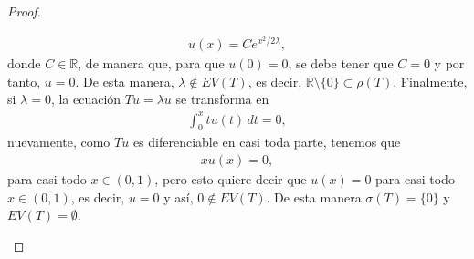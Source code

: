\begin{proof}
\begin{enumerate}
        \begin{align*}
            u(x)=Ce^{x^2/2\lambda},
        \end{align*}
        donde $C \in \mathbb{R}$, de manera que, para que $u(0)=0$, se debe tener que $C=0$ y por tanto, $u=0$. De esta manera, $\lambda\notin EV(T)$, es decir, $\mathbb{R}\setminus \{0\}\subset \rho(T)$. Finalmente, si $\lambda=0$, la ecuación $Tu=\lambda u$ se transforma en
        \begin{align*}
            \int_0^x tu(t)\, dt=0,
        \end{align*}
        nuevamente, como $Tu$ es diferenciable en casi toda parte, tenemos que 
        \begin{align*}
            xu(x)=0,
        \end{align*}
        para casi todo $x \in (0,1)$, pero esto quiere decir que $u(x)=0$ para casi todo $x \in (0,1)$, es decir, $u=0$ y así, $0 \notin EV(T)$. De esta manera $\sigma(T)=\{0\}$ y $EV(T)=\emptyset$.


\end{enumerate}
\end{proof}
